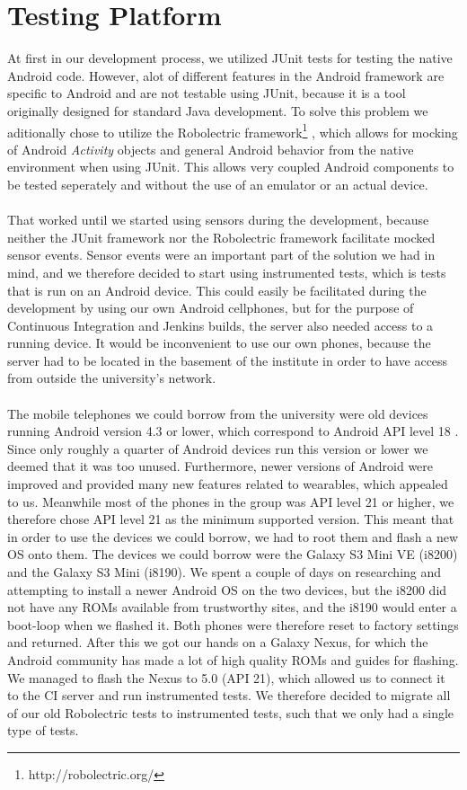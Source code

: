
\section{Testing Platform}
\label{sub:testing_platform}

At first in our development process, we utilized JUnit tests for testing the native Android code. However, alot of different features in the Android framework are specific to Android and are not testable using JUnit, because it is a tool originally designed for standard Java development. To solve this problem we aditionally chose to utilize the Robolectric framework\footnote{http://robolectric.org/} , which allows for mocking of Android \emph{Activity} objects and general Android behavior from the native environment when using JUnit. This allows very coupled Android components to be tested seperately and without the use of an emulator or an actual device. 
\\\\
That worked until we started using sensors during the development, because neither the JUnit framework nor the Robolectric framework facilitate mocked sensor events. Sensor events were an important part of the solution we had in mind, and we therefore decided to start using instrumented tests, which is tests that is run on an Android device. This could easily be facilitated during the development by using our own Android cellphones, but for the purpose of Continuous Integration and Jenkins builds, the server also needed access to a running device. It would be inconvenient to use our own phones, because the server had to be located in the basement of the institute in order to have access from outside the university's network. 
\\\\
The mobile telephones we could borrow from the university were old devices running Android version 4.3 or lower, which correspond to Android API level 18 \parencite{uses_sdk}. Since only roughly a quarter of Android devices run this version or lower \parencite{android_dashboard} we deemed that it was too unused. Furthermore, newer versions of Android were improved and provided many new features related to wearables, which appealed to us. Meanwhile most of the phones in the group was API level 21 or higher, we therefore chose API level 21 as the minimum supported version. 
\newpage
This meant that in order to use the devices we could borrow, we had to root them and flash a new OS onto them. The devices we could borrow were the Galaxy S3 Mini VE (i8200) and the Galaxy S3 Mini (i8190). We spent a couple of days on researching and attempting to install a newer Android OS on the two devices, but the i8200 did not have any ROMs available from trustworthy sites, and the i8190 would enter a boot-loop when we flashed it. Both phones were therefore reset to factory settings and returned. After this we got our hands on a Galaxy Nexus, for which the Android community has made a lot of high quality ROMs and guides for flashing. We managed to flash the Nexus to 5.0 (API 21), which allowed us to connect it to the CI server and run instrumented tests. We therefore decided to migrate all of our old Robolectric tests to instrumented tests, such that we only had a single type of tests. 
